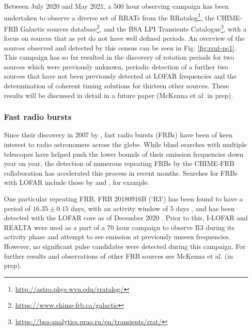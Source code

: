 Between July 2020 and May 2021, a 500 hour observing campaign has been undertaken to observe a diverse set of RRATs from the RRatalog\footnote{\hyperref[RRatalog]{http://astro.phys.wvu.edu/rratalog/}}, the CHIME-FRB Galactic sources database\footnote{\hyperref[CHIME-FRB Galactic Sources]{https://www.chime-frb.ca/galactic}}, and the BSA LPI Transients Catalogue\footnote{\hyperref[BSA LPI Transients Catalogue]{https://bsa-analytics.prao.ru/en/transients/rrat/}}, with a focus on sources that as yet do not have well defined periods. An overview of the sources observed and detected by this census can be seen in Fig. \ref{fig:rrat-pc1}. This campaign has so far resulted in the discovery of rotation periods for two sources which were previously unknown, periodic detection of a further two sources that have not been previously detected at LOFAR frequencies and the determination of coherent timing solutions for thirteen other sources. These results will be discussed in detail in a future paper (McKenna et al. in prep).%


\subsubsection{Fast radio bursts}
Since their discovery in 2007 by \citeauthor{Lorimer2007}, fast radio bursts (FRBs) have been of keen interest to radio astronomers across the globe. While blind searches with multiple telescopes have helped push the lower bounds of their emission frequencies down year on year, the detection of numerous repeating FRBs by the CHIME-FRB collaboration \citep{CHIME2019} has accelerated this process in recent months. Searches for FRBs with LOFAR include those by \cite{Karastergiou2015} and \cite{TerVeen2019}, for example.

One particular repeating FRB, FRB 20180916B (`R3') has been found to have a period of $16.35\pm 0.15$ days, with an activity window of 5 days \citep{Amiri2020}, and has been detected with the LOFAR core as of December 2020 \citep{Pastor-Marazuela2020, Pleunis2021}. Prior to this, I-LOFAR and REALTA were used as a part of a 70 hour campaign to observe R3 during its activity phase and attempt to see emission at previously unseen frequencies. However, no significant pulse candidates were detected during this campaign. For further results and observations of other FRB sources see McKenna et al. (in prep).

